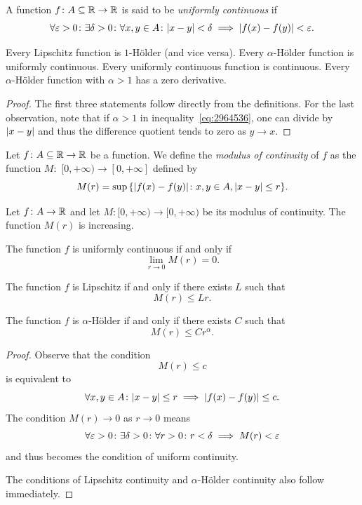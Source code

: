 \begin{definition}
\mymark{**}%
A function $f\colon A \subseteq {\mathbb R} \to {\mathbb R}$ is said to be \emph{uniformly
continuous}
%
%
%
if
\[
 \forall \varepsilon>0\colon \exists \delta > 0 \colon
 \forall x,y\in A \colon {\left|x-y\right|} < \delta \implies {\left|f(x)-f(y)\right|} < \varepsilon.
\]
\end{definition}

\begin{theorem}
Every Lipschitz function is $1$-Hölder (and vice versa).
Every $\alpha$-Hölder function is uniformly continuous.
Every uniformly continuous function is continuous.
Every $\alpha$-Hölder function with $\alpha>1$ has a zero derivative.
\end{theorem}
%
\begin{proof}
The first three statements follow directly from the definitions.
For the last observation, note that if $\alpha>1$ in
inequality~\eqref{eq:2964536}, one can divide by ${\left|x-y\right|}$ and thus the
difference quotient tends to zero as $y\to x$.
\end{proof}

\begin{definition}
Let $f\colon A\subseteq {\mathbb R} \to{\mathbb R}$ be a function.
We define the \emph{modulus of continuity}%
%
 of $f$ as the function $M\colon$ $[0,+\infty) \to [0,+\infty]$ defined by
\[
  M(r) = \sup {\left\{ {\left|f(x)-f(y)\right|}\colon x,y \in A, {\left|x-y\right|} \le r \right\}}.
\]
\end{definition}

\begin{theorem}
Let $f\colon A\to {\mathbb R}$ and let $M\colon [0,+\infty)\to [0,+\infty)$ be its
modulus of continuity.
The function $M(r)$ is increasing.

The function $f$ is uniformly continuous if and only if
\[
  \lim_{r\to 0} M(r) = 0.
\]

The function $f$ is Lipschitz if and only if there exists $L$ such that
\[
  M(r) \le Lr.
\]

The function $f$ is $\alpha$-Hölder if and only if there exists $C$ such that
\[
  M(r) \le C r^\alpha.
\]
\end{theorem}
%
\begin{proof}
Observe that the condition
\[
   M(r) \le c
\]
is equivalent to
\[
\forall x,y\in A \colon {\left|x-y\right|}\le r \implies  {\left|f(x)-f(y)\right|} \le c.
\]
The condition $M(r)\to 0$ as $r \to 0$ means
\[
 \forall \varepsilon>0\colon \exists \delta>0 \colon \forall r>0\colon r<\delta \implies M(r)<\varepsilon
\]
and thus becomes the condition of uniform continuity.

The conditions of Lipschitz continuity and $\alpha$-Hölder continuity also
follow immediately.
\end{proof}

